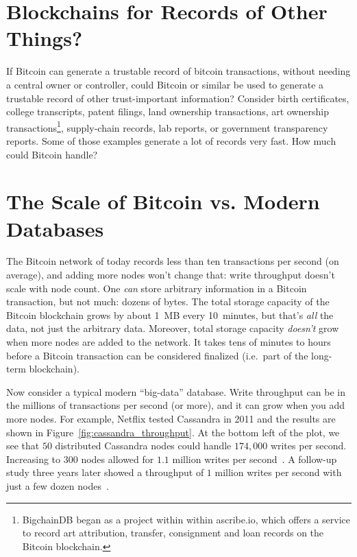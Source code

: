 \documentclass[a4paper]{article}
\begin{document}
\section{Blockchains for Records of Other Things?}

If Bitcoin can generate a trustable record of bitcoin transactions,
without needing a central owner or controller,
could Bitcoin or similar be used
to generate a trustable record of other trust-important information?
Consider
birth certificates,
college transcripts,
patent filings,
land ownership transactions,
art ownership transactions\footnote{BigchainDB
began as a project within within ascribe.io,
which offers a service to record art attribution, transfer,
consignment and loan records on the Bitcoin blockchain.},
supply-chain records,
lab reports,
or
government transparency reports.
Some of those examples
generate a lot of records very fast.
How much could Bitcoin handle?


\section{The Scale of Bitcoin vs. Modern Databases}

The Bitcoin network of today records less than ten transactions per second (on average),
and adding more nodes won't change that: write throughput doesn't scale with node count.
One \emph{can} store arbitrary information in a Bitcoin transaction,
but not much: dozens of bytes.
The total storage capacity of the Bitcoin blockchain grows
by about 1~MB every 10~minutes, but that's \emph{all} the data, not just the arbitrary data.
Moreover, total storage capacity \emph{doesn't} grow when more nodes are added to the network.
It takes tens of minutes to hours before a Bitcoin transaction can be considered finalized
(i.e.~part of the long-term blockchain).

Now consider a typical modern ``big-data'' database.
Write throughput can be in the millions of transactions per second (or more),
and it can grow when you add more nodes.
For example, Netflix tested Cassandra in 2011 and the results
are shown in Figure~\ref{fig:cassandra_throughput}.
At the bottom left of the plot, we see that $50$ distributed Cassandra nodes could handle $174,000$ writes per second.
Increasing to $300$ nodes allowed for $1.1$ million writes per second~\cite{cockcroft2011benchmarking}.
A follow-up study three years later showed a throughput of $1$ million writes per second with just a few dozen nodes~\cite{kalantzis_netflix}.
\end{document}
